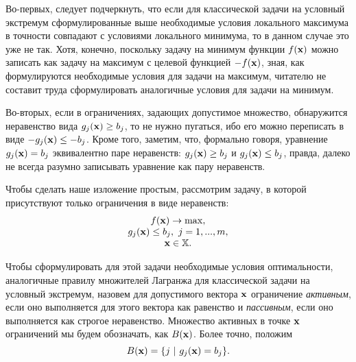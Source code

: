     Во-первых, следует подчеркнуть, что если для классической задачи на
    условный экстремум сформулированные выше необходимые условия локального
    максимума в точности
    совпадают с условиями локального минимума, то в данном случае
    это уже не так. Хотя, конечно, поскольку задачу на минимум функции $f(\mathbf{x})$
    можно записать как задачу на максимум с целевой функцией
    $-f(\mathbf{x})$, зная, как формулируются необходимые условия для
    задачи на максимум, читателю не составит труда сформулировать
    аналогичные условия для задачи на минимум.

    Во-вторых, если в ограничениях, задающих допустимое
    множество, обнаружится неравенство  вида $g_{j}(\mathbf{x})\geq b_{j}$,
    то не нужно пугаться, ибо его можно переписать в виде
    $-g_{j}(\mathbf{x})\leq -b_{j}$. Кроме того, заметим, что, формально
    говоря, уравнение $g_{j}(\mathbf{x})= b_{j}$ эквивалентно паре
    неравенств: $g_{j}(\mathbf{x})\geq b_{j}$ и $g_{j}(\mathbf{x})\leq b_{j}$,
    правда, далеко не всегда разумно записывать уравнение как пару
    неравенств.

    Чтобы сделать наше изложение простым, рассмотрим задачу, в
    которой присутствуют только ограничения в виде неравенств:
\begin{equation}
    \label{zad-np-ner}
    \begin{array}{c}
      f(\mathbf{x})\rightarrow\max, \\
      g_{j}(\mathbf{x})\leq b_{j}, \ j=1,...,m, \\
    \mathbf{x}\in\mathbb{X}.
    \end{array}
\end{equation}

    Чтобы сформулировать для этой задачи необходимые условия оптимальности,
    аналогичные правилу множителей Лагранжа для классической задачи
    на условный экстремум, назовем для допустимого вектора $\mathbf{x}$
    ограничение \emph{активным}, если оно выполняется для этого вектора как
    равенство и \emph{пассивным}, если оно выполняется как строгое
    неравенство. Множество активных в точке $\mathbf{x}$ ограничений мы
    будем обозначать, как $B(\mathbf{x})$. Более точно, положим
    \[B(\vc{x})=\{j \ | \ g_{j}(\vc{x})=b_{j} \}.\]

